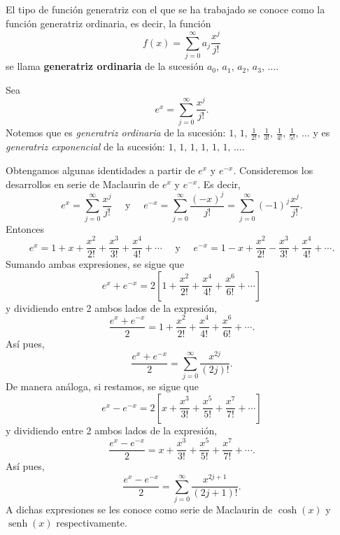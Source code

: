 \begin{obs}{}{}
    El tipo de función generatriz con el que se ha trabajado se conoce como la función generatriz ordinaria, es decir, la función
    $$f(x) = \sum_{j=0}^{\infty} a_j \frac{x^{j}}{j!}$$
    se llama \textbf{generatriz ordinaria} de la sucesión $a_0$, $a_1$, $a_2$, $a_3$, $\dots$.
\end{obs}

\begin{obs}{}{}
    Sea
    $$e^{x} = \sum_{j=0}^{\infty} \frac{x^{j}}{j!}.$$
    Notemos que es \textit{generatriz ordinaria} de la sucesión: $\displaystyle 1, \, 1, \, \frac{1}{2!}, \, \frac{1}{3!}, \, \frac{1}{4!}, \, \frac{1}{5!}, \, \dots$ y es \textit{generatriz exponencial} de la sucesión: $1, \, 1, \, 1, \, 1, \, 1, \, 1, \, \dots$.
\end{obs}

\begin{myexample}
    Obtengamos algunas identidades a partir de $e^{x}$ y $e^{-x}$. Consideremos los desarrollos en serie de Maclaurin de $e^{x}$ y $e^{-x}$. Es decir,
    $$e^{x} = \sum_{j=0}^{\infty} \frac{x^{j}}{j!} \quad \text{ y } \quad e^{-x} = \sum_{j=0}^{\infty} \frac{(-x)^{j}}{j!} = \sum_{j=0}^{\infty} (-1)^{j} \frac{x^{j}}{j!}.$$
    Entonces
    $$e^{x} = 1 + x + \frac{x^{2}}{2!} + \frac{x^{3}}{3!} + \frac{x^{4}}{4!} + \cdots \quad \text{ y } \quad e^{-x} = 1 - x + \frac{x^{2}}{2!} - \frac{x^{3}}{3!} + \frac{x^{4}}{4!} + \cdots.$$
    Sumando ambas expresiones, se sigue que
    $$e^{x} + e^{-x} = 2 \left[ 1 + \frac{x^{2}}{2!} + \frac{x^{4}}{4!} + \frac{x^{6}}{6!} + \cdots \right]$$
    y dividiendo entre 2 ambos lados de la expresión,
    $$\frac{e^{x} + e^{-x}}{2} = 1 + \frac{x^{2}}{2!} + \frac{x^{4}}{4!} + \frac{x^{6}}{6!} + \cdots.$$
    Así pues,
    $$\frac{e^{x} + e^{-x}}{2} = \sum_{j=0}^{\infty} \frac{x^{2j}}{(2j)!}.$$
    De manera análoga, si restamos, se sigue que
    $$e^{x} - e^{-x} = 2 \left[ x + \frac{x^{3}}{3!} + \frac{x^{5}}{5!} + \frac{x^{7}}{7!} + \cdots \right]$$
    y dividiendo entre 2 ambos lados de la expresión,
    $$\frac{e^{x} - e^{-x}}{2} = x + \frac{x^{3}}{3!} + \frac{x^{5}}{5!} + \frac{x^{7}}{7!} + \cdots.$$
    Así pues,
    $$\frac{e^{x} - e^{-x}}{2} = \sum_{j=0}^{\infty} \frac{x^{2j+1}}{(2j+1)!}.$$
    A dichas expresiones se les conoce como serie de Maclaurin de $\cosh(x)$ y $\operatorname{senh}(x)$ respectivamente.
\end{myexample}

